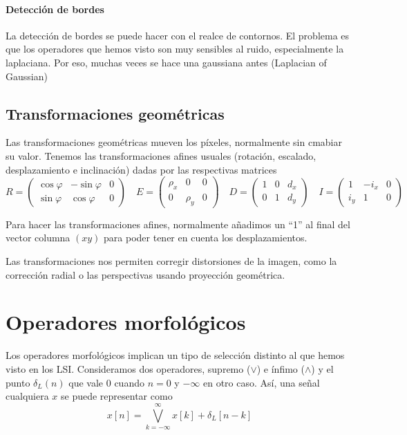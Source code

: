 \documentclass[nochap,palatino]{apuntes}
\begin{document}
\paragraph{Detección de bordes} La detección de bordes se puede hacer con el realce de contornos. El problema es que los operadores que hemos visto son muy sensibles al ruido, especialmente la laplaciana. Por eso, muchas veces se hace una gaussiana antes (Laplacian of Gaussian)

\subsection{Transformaciones geométricas}

Las transformaciones geométricas mueven los píxeles, normalmente sin cmabiar su valor. Tenemos las transformaciones afines usuales (rotación, escalado, desplazamiento e inclinación) dadas por las respectivas matrices \[
R = \begin{pmatrix} \cos φ & - \sin φ & 0 \\ \sin φ & \cos φ & 0 \end{pmatrix}\quad
E = \begin{pmatrix} ρ_x & 0 & 0 \\ 0 & ρ_y & 0 \end{pmatrix} \quad
D = \begin{pmatrix} 1 & 0 & d_x \\ 0 &  1 & d_y \end{pmatrix} \quad
I = \begin{pmatrix} 1 & -i_x & 0 \\ i_y &  1 & 0 \end{pmatrix} \quad
\]

Para hacer las transformaciones afines, normalmente añadimos un ``1'' al final del vector columna $(x y)$ para poder tener en cuenta los desplazamientos.

Las transformaciones nos permiten corregir distorsiones de la imagen, como la corrección radial o las perspectivas usando proyección geométrica.

\section{Operadores morfológicos}


Los operadores morfológicos implican un tipo de selección distinto al que hemos visto en los LSI. Consideramos dos operadores, supremo ($\vee$) e ínfimo ($\wedge$) y el punto $δ_L(n)$ que vale $0$ cuando $n = 0$ y $- ∞$ en otro caso. Así, una señal cualquiera $x$ se puede representar como \[ x[n] = \bigvee_{k=-∞}^∞ x[k] + δ_L[n-k]\]
\end{document}
